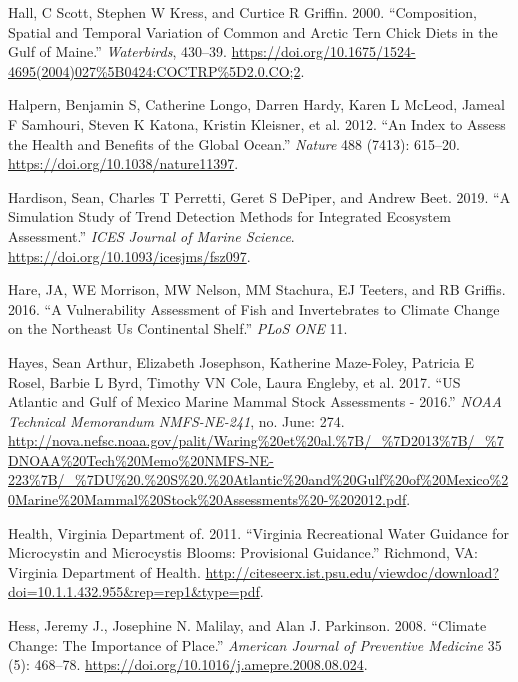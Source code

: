 \documentclass[
]{book}
\newlength{\cslhangindent}
\newenvironment{cslreferences}%
  {\setlength{\parindent}{0pt}%
  \everypar{\setlength{\hangindent}{\cslhangindent}}\ignorespaces}%
  {\par}
\begin{document}
\begin{cslreferences}
\leavevmode\hypertarget{ref-hall2000}{}%
Hall, C Scott, Stephen W Kress, and Curtice R Griffin. 2000. ``Composition, Spatial and Temporal Variation of Common and Arctic Tern Chick Diets in the Gulf of Maine.'' \emph{Waterbirds}, 430--39. \url{https://doi.org/10.1675/1524-4695(2004)027\%5B0424:COCTRP\%5D2.0.CO;2}.

\leavevmode\hypertarget{ref-halpern_index_2012}{}%
Halpern, Benjamin S, Catherine Longo, Darren Hardy, Karen L McLeod, Jameal F Samhouri, Steven K Katona, Kristin Kleisner, et al. 2012. ``An Index to Assess the Health and Benefits of the Global Ocean.'' \emph{Nature} 488 (7413): 615--20. \url{https://doi.org/10.1038/nature11397}.

\leavevmode\hypertarget{ref-hardison2019}{}%
Hardison, Sean, Charles T Perretti, Geret S DePiper, and Andrew Beet. 2019. ``A Simulation Study of Trend Detection Methods for Integrated Ecosystem Assessment.'' \emph{ICES Journal of Marine Science}. \url{https://doi.org/10.1093/icesjms/fsz097}.

\leavevmode\hypertarget{ref-Hare2016}{}%
Hare, JA, WE Morrison, MW Nelson, MM Stachura, EJ Teeters, and RB Griffis. 2016. ``A Vulnerability Assessment of Fish and Invertebrates to Climate Change on the Northeast Us Continental Shelf.'' \emph{PLoS ONE} 11.

\leavevmode\hypertarget{ref-Hayes2017}{}%
Hayes, Sean Arthur, Elizabeth Josephson, Katherine Maze-Foley, Patricia E Rosel, Barbie L Byrd, Timothy VN Cole, Laura Engleby, et al. 2017. ``US Atlantic and Gulf of Mexico Marine Mammal Stock Assessments - 2016.'' \emph{NOAA Technical Memorandum NMFS-NE-241}, no. June: 274. \url{http://nova.nefsc.noaa.gov/palit/Waring\%20et\%20al.\%7B/_\%7D2013\%7B/_\%7DNOAA\%20Tech\%20Memo\%20NMFS-NE-223\%7B/_\%7DU\%20.\%20S\%20.\%20Atlantic\%20and\%20Gulf\%20of\%20Mexico\%20Marine\%20Mammal\%20Stock\%20Assessments\%20-\%202012.pdf}.

\leavevmode\hypertarget{ref-VDH2011}{}%
Health, Virginia Department of. 2011. ``Virginia Recreational Water Guidance for Microcystin and Microcystis Blooms: Provisional Guidance.'' Richmond, VA: Virginia Department of Health. \url{http://citeseerx.ist.psu.edu/viewdoc/download?doi=10.1.1.432.955\&rep=rep1\&type=pdf}.

\leavevmode\hypertarget{ref-hess_climate_2008}{}%
Hess, Jeremy J., Josephine N. Malilay, and Alan J. Parkinson. 2008. ``Climate Change: The Importance of Place.'' \emph{American Journal of Preventive Medicine} 35 (5): 468--78. \url{https://doi.org/10.1016/j.amepre.2008.08.024}.


\end{cslreferences}
\end{document}
